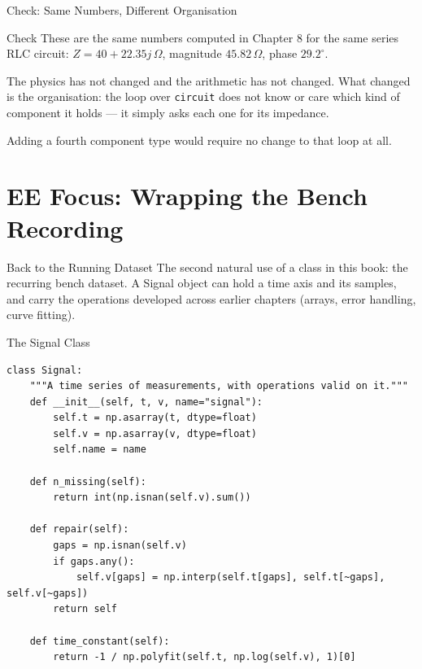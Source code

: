 \documentclass[9pt,aspectratio=169,xcolor=table]{beamer}
\begin{document}
\begin{frame}{Check: Same Numbers, Different Organisation}
    \leavevmode
    \begin{block}{Check}
        These are the \alert{same numbers} computed in Chapter 8 for the
        same series RLC circuit: $Z = 40 + 22.35j\,\Omega$, magnitude
        $45.82\,\Omega$, phase $29.2^{\circ}$.
    \end{block}

    \vspace{3mm}
    The physics has not changed and the arithmetic has not changed. What
    changed is the \alert{organisation}: the loop over \texttt{circuit}
    does not know or care which kind of component it holds --- it simply
    asks each one for its impedance.

    \vspace{2mm}
    {\small Adding a fourth component type would require no change to
    that loop at all.}
\end{frame}

\section{EE Focus: Wrapping the Bench Recording}

\begin{frame}{Back to the Running Dataset}
    \leavevmode
    The second natural use of a class in this book: the recurring bench
    dataset. A \alert{Signal} object can hold a time axis and its
    samples, and carry the operations developed across earlier chapters
    (arrays, error handling, curve fitting).
\end{frame}

\begin{frame}[fragile]{The Signal Class}
    \leavevmode
\begin{lstlisting}
class Signal:
    """A time series of measurements, with operations valid on it."""
    def __init__(self, t, v, name="signal"):
        self.t = np.asarray(t, dtype=float)
        self.v = np.asarray(v, dtype=float)
        self.name = name

    def n_missing(self):
        return int(np.isnan(self.v).sum())

    def repair(self):
        gaps = np.isnan(self.v)
        if gaps.any():
            self.v[gaps] = np.interp(self.t[gaps], self.t[~gaps], self.v[~gaps])
        return self

    def time_constant(self):
        return -1 / np.polyfit(self.t, np.log(self.v), 1)[0]
\end{lstlisting}
\end{frame}
\end{document}
